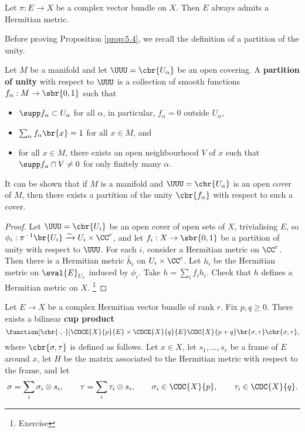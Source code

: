 \begin{proposition}
\label{prop:5.4}
Let $ \pi : E \to X $ be a complex vector bundle on $ X $. Then $ E $ always admits a Hermitian metric.
\end{proposition}

Before proving Proposition \ref{prop:5.4}, we recall the definition of a partition of the unity.

\begin{definition}
Let $ M $ be a manifold and let $ \UUU = \cbr{U_\alpha} $ be an open covering. A \textbf{partition of unity} with respect to $ \UUU $ is a collection of smooth functions $ f_\alpha : M \to \sbr{0, 1} $ such that
\begin{itemize}
\item $ \supp f_\alpha \subset U_\alpha $ for all $ \alpha $, in particular, $ f_\alpha = 0 $ outside $ U_\alpha $,
\item $ \sum_\alpha f_\alpha\br{x} = 1 $ for all $ x \in M $, and
\item for all $ x \in M $, there exists an open neighbourhood $ V $ of $ x $ such that $ \supp f_\alpha \cap V \ne 0 $ for only finitely many $ \alpha $.
\end{itemize}
\end{definition}

It can be shown that if $ M $ is a manifold and $ \UUU = \cbr{U_\alpha} $ is an open cover of $ M $, then there exists a partition of the unity $ \cbr{f_\alpha} $ with respect to such a cover.

\begin{proof}
Let $ \UUU = \cbr{U_i} $ be an open cover of open sets of $ X $, trivialising $ E $, so $ \phi_i : \pi^{-1}\br{U_i} \xrightarrow{\sim} U_i \times \CC^r $, and let $ f_i : X \to \sbr{0, 1} $ be a partition of unity with respect to $ \UUU $. For each $ i $, consider a Hermitian metric on $ \CC^r $. Then there is a Hermitian metric $ \widetilde{h_i} $ on $ U_i \times \CC^r $. Let $ h_i $ be the Hermitian metric on $ \eval{E}_{U_i} $ induced by $ \phi_i $. Take $ h = \sum_i f_ih_i $. Check that $ h $ defines a Hermitian metric on $ X $. \footnote{Exercise}
\end{proof}


Let $ E \to X $ be a complex Hermitian vector bundle of rank $ r $. Fix $ p, q \ge 0 $. There exists a bilinear \textbf{cup product}
$$ \function[\cbr{\cdot, \cdot}]{\COCE{X}{p}{E} \times \COCE{X}{q}{E}}{\COC{X}{p + q}}{\br{\sigma, \tau}}{\cbr{\sigma, \tau}}, $$
where $ \cbr{\sigma, \tau} $ is defined as follows. Let $ x \in X $, let $ s_1, \dots, s_r $ be a frame of $ E $ around $ x $, let $ H $ be the matrix associated to the Hermitian metric with respect to the frame, and let
$$ \sigma = \sum_i \sigma_i \otimes s_i, \qquad \tau = \sum_i \tau_i \otimes s_i, \qquad \sigma_i \in \COC{X}{p}, \qquad \tau_i \in \COC{X}{q}. $$

